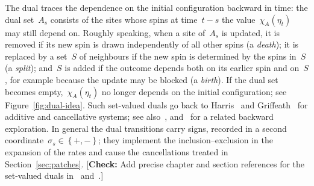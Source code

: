 \documentclass[EJP,preprint,NODS,nobera]{ejpecp}
\newcommand{\cb}[1]{\left\{#1\right\}}
\newcommand{\chg}[1]{{\color{changegreen}#1}}
\newcommand{\authorcheck}[1]{{\color{blue}[\textbf{Check:} #1]}}
\begin{document}
\chg{The dual traces the dependence on the initial configuration backward in
time: the dual set~$A_s$ consists of the sites whose spins at time~$t-s$ the
value~$\chi_A(\eta_t)$ may still depend on. Roughly speaking, when a site
of~$A_s$ is updated, it is removed if its new spin is drawn independently of
all other spins (a \emph{death}); it is replaced by a set~$S$ of neighbours
if the new spin is determined by the spins in~$S$ (a \emph{split}); and~$S$
is added if the outcome depends both on its earlier spin and on~$S$, for
example because the update may be blocked (a \emph{birth}). If the dual set
becomes empty,~$\chi_A(\eta_t)$ no longer depends on the initial
configuration; see Figure~\ref{fig:dual-idea}. Such set-valued duals go back
to Harris~\cite{Harris1978} and Griffeath~\cite{Griffeath1979} for additive
and cancellative systems; see also~\cite{Liggett1985,Gray1986,JansenKurt2014},
and~\cite{LubetzkySly2016} for a related backward exploration. In general the
dual transitions carry signs, recorded in a second
coordinate~$\sigma_s\in\cb{+,-}$; they implement the inclusion--exclusion in
the expansion of the rates and cause the cancellations treated in
Section~\ref{sec:patches}.}
\authorcheck{Add precise chapter and section references for the set-valued
duals in~\cite{Liggett1985} and~\cite{Griffeath1979}.}
\end{document}

